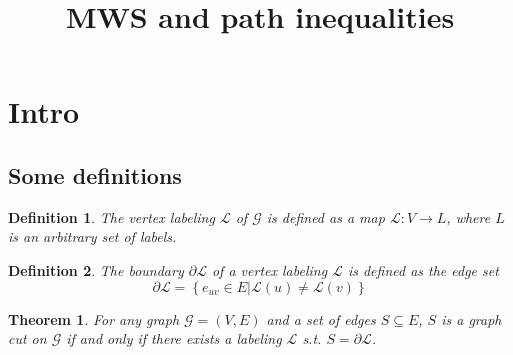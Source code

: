 \documentclass[12pt]{article}
\newtheorem{theorem}{Theorem}[section]
\newtheorem{definition}{Definition}[section]
\begin{document}
 
 
\title{MWS and path inequalities}%
 
\maketitle
\section{Intro}
\subsection{Some definitions}
\begin{definition}
The vertex labeling $\mathcal{L}$ of $\mathcal{G}$ is defined as a map $\mathcal{L}: V \rightarrow L $, where $L$ is an arbitrary set of labels.
\end{definition}

\begin{definition}
The \emph{boundary} $\partial \mathcal{L}$ of a vertex labeling $\mathcal{L}$ is defined as the edge set 
$$
\partial \mathcal{L} = \left\{ e_{uv}\in E | \mathcal{L}(u) \neq \mathcal{L}(v)\right\}
$$
\end{definition}

\begin{theorem}
For any graph $\mathcal{G}=(V,E)$ and a set of edges $S\subseteq E$, $S$ is a graph cut on $\mathcal{G}$ if and only if there exists a labeling $\mathcal{L}$ s.t. $S=\partial \mathcal{L}$. 
\end{theorem}
\end{document}
